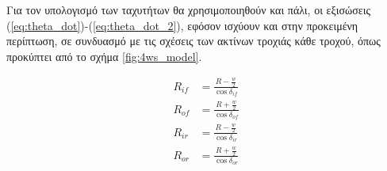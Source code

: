 %
%
%
%
%

\bigskip
Για τον υπολογισμό των ταχυτήτων θα χρησιμοποιηθούν και πάλι, οι εξισώσεις (\ref{eq:theta_dot})-(\ref{eq:theta_dot_2}), εφόσον ισχύουν και στην προκειμένη περίπτωση, σε συνδυασμό με τις σχέσεις των ακτίνων τροχιάς κάθε τροχού, όπως προκύπτει από το σχήμα \ref{fig:4ws_model}.

\begin{align}
	R_{if} &= \frac{R - \frac{w}{2}}{\cos{\delta_{if}}}
	\label{eq:neg_4ws_rif}\\
	R_{of} &= \frac{R + \frac{w}{2}}{\cos{\delta_{of}}}
	\label{eq:neg_4ws_rof}\\
	R_{ir} &= \frac{R - \frac{w}{2}}{\cos{\delta_{ir}}}
	\label{eq:neg_4ws_rir}\\
	R_{or} &= \frac{R + \frac{w}{2}}{\cos{\delta_{or}}}
	\label{eq:neg_4ws_or}
\end{align}

